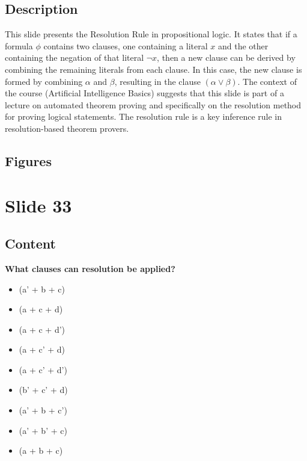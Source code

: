 \documentclass{article}%
\begin{document}
\subsection{Description}%
This slide presents the Resolution Rule in propositional logic.  It states that if a formula $\phi$ contains two clauses, one containing a literal $x$ and the other containing the negation of that literal $\neg x$, then a new clause can be derived by combining the remaining literals from each clause.  In this case, the new clause is formed by combining $\alpha$ and $\beta$, resulting in the clause $(\alpha \vee \beta)$. The context of the course (Artificial Intelligence Basics) suggests that this slide is part of a lecture on automated theorem proving and specifically on the resolution method for proving logical statements.  The resolution rule is a key inference rule in resolution-based theorem provers.%
\subsection{Figures}%
\begin{figure}[H]%
\centering%
\end{figure}

%
\newpage%
\section{Slide 33}%
\label{sec:Slide33}%
\subsection{Content}%

\textbf{What clauses can resolution be applied?}

\begin{itemize}
    \item (a' + b + c)
    \item (a + c + d)
    \item (a + c + d')
    \item (a + c' + d)
    \item (a + c' + d')
    \item (b' + c' + d)
    \item (a' + b + c')
    \item (a' + b' + c)
    \item (a + b + c)
\end{itemize}
\end{document}
